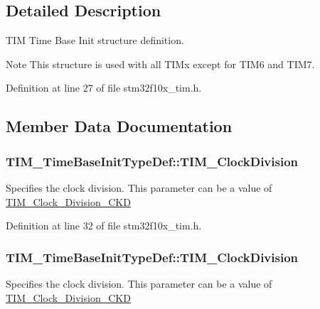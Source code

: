 \subsection{Detailed Description}
T\+IM Time Base Init structure definition. 

\begin{DoxyNote}{Note}
This structure is used with all T\+I\+Mx except for T\+I\+M6 and T\+I\+M7. 
\end{DoxyNote}


Definition at line 27 of file stm32f10x\+\_\+tim.\+h.



\subsection{Member Data Documentation}
\subsubsection[{\texorpdfstring{T\+I\+M\+\_\+\+Clock\+Division}{TIM_ClockDivision}}]{ T\+I\+M\+\_\+\+Time\+Base\+Init\+Type\+Def\+::\+T\+I\+M\+\_\+\+Clock\+Division}\hypertarget{struct_t_i_m___time_base_init_type_def_a738ff90643f12e35df13f4fc9d3b3a20}{}\label{struct_t_i_m___time_base_init_type_def_a738ff90643f12e35df13f4fc9d3b3a20}
Specifies the clock division. This parameter can be a value of \hyperlink{group___t_i_m___clock___division___c_k_d}{T\+I\+M\+\_\+\+Clock\+\_\+\+Division\+\_\+\+C\+KD} 

Definition at line 32 of file stm32f10x\+\_\+tim.\+h.

\subsubsection[{\texorpdfstring{T\+I\+M\+\_\+\+Clock\+Division}{TIM_ClockDivision}}]{ T\+I\+M\+\_\+\+Time\+Base\+Init\+Type\+Def\+::\+T\+I\+M\+\_\+\+Clock\+Division}\hypertarget{struct_t_i_m___time_base_init_type_def_ab473f51adaa9474702e454fc8c24a407}{}\label{struct_t_i_m___time_base_init_type_def_ab473f51adaa9474702e454fc8c24a407}
Specifies the clock division. This parameter can be a value of \hyperlink{group___t_i_m___clock___division___c_k_d}{T\+I\+M\+\_\+\+Clock\+\_\+\+Division\+\_\+\+C\+KD} 

